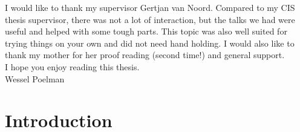 \documentclass[
10pt, %
a4paper, %
oneside, %
headinclude,footinclude, %
] {book}%
\begin{document}
I would like to thank my supervisor Gertjan van Noord.
Compared to my CIS thesis supervisor, there was not a lot of interaction, but the talks we had were useful and helped with some tough parts.
This topic was also well suited for trying things on your own and did not need hand holding.
I would also like to thank my mother for her proof reading (second time!) and general support.\\

I hope you enjoy reading this thesis.\\

Wessel Poelman


\chapter{Introduction}



\end{document}
